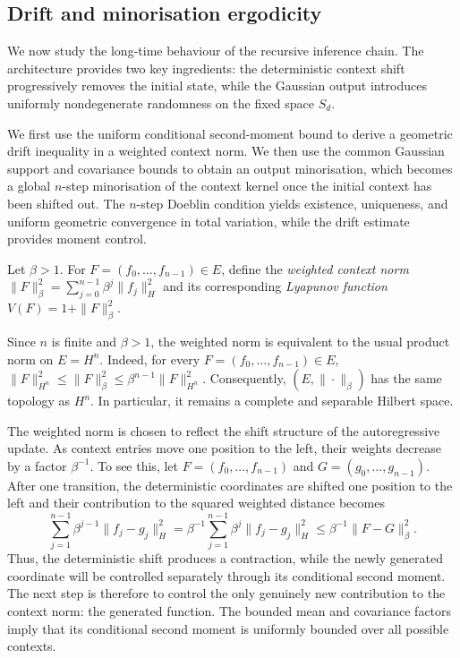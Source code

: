 \subsection{Drift and minorisation ergodicity}\label{subsec:Drift and minorisation ergodicity}

We now study the long-time behaviour of the recursive inference chain. The architecture provides two key ingredients: the deterministic context shift progressively removes the initial state, while the Gaussian output introduces uniformly nondegenerate randomness on the fixed space \(S_d\).

We first use the uniform conditional second-moment bound to derive a geometric drift inequality in a weighted context norm. We then use the common Gaussian support and covariance bounds to obtain an output minorisation, which becomes a global \(n\)-step minorisation of the context kernel once the initial context has been shifted out. The \(n\)-step Doeblin condition yields existence, uniqueness, and uniform geometric convergence in total variation, while the drift estimate provides moment control.

\begin{definition}\label{def:Weighted context norm}
Let \(\beta>1\). For \(F=(f_0,\ldots,f_{n-1})\in E\), define the \emph{weighted context norm}
\(
\|F\|_\beta^2
=\sum_{j=0}^{n-1}\beta^j\|f_j\|_H^2
\) and its corresponding \emph{Lyapunov function}
\(
V(F)=1+\|F\|_\beta^2.
\)
\end{definition}

Since \(n\) is finite and \(\beta>1\), the weighted norm is equivalent to the usual product norm on \(E=H^n\). Indeed, for every \(F=(f_0,\ldots,f_{n-1})\in E\), \(\|F\|_{H^n}^2\leqslant\|F\|_\beta^2\leqslant\beta^{n-1}\|F\|_{H^n}^2\). Consequently, \((E,\|\cdot\|_\beta)\) has the same topology as \(H^n\). In particular, it remains a complete and separable Hilbert space.

The weighted norm is chosen to reflect the shift structure of the autoregressive update. As context entries move one position to the left, their weights decrease by a factor \(\beta^{-1}\). To see this, let \(F=(f_0,\ldots,f_{n-1})\) and \(G=(g_0,\ldots,g_{n-1})\). After one transition, the deterministic coordinates are shifted one position to the left and their contribution to the squared weighted distance becomes
\[
\sum_{j=1}^{n-1}\beta^{j-1}\|f_j-g_j\|_H^2=\beta^{-1}\sum_{j=1}^{n-1}\beta^j\|f_j-g_j\|_H^2\leqslant\beta^{-1}\|F-G\|_\beta^2.
\]
Thus, the deterministic shift produces a contraction, while the newly generated coordinate will be controlled separately through its conditional second moment. The next step is therefore to control the only genuinely new contribution to the context norm: the generated function. The bounded mean and covariance factors imply that its conditional second moment is uniformly bounded over all possible contexts.


